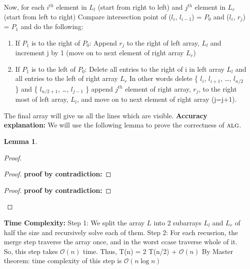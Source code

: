 \documentclass[11pt]{article}
\renewcommand{\O}{\mathcal{O}}
\newcommand{\alg}{\textsc{alg}}
\newtheorem{lemma}[theorem]{Lemma}
\begin{document}
Now, for each $i^{th}$ element in $L_l$ (start from right to left) and $j^{th}$ element in $L_r$ (start from left to right) \newline
Compare intersection point of ($l_i$, $l_{i-1}$) = $P_0$ and  ($l_i$, $r_j$) = $P_1$ and do the following: \newline
\begin{enumerate}
\item If $P_1$ is to the right of $P_0$: \newline
Append $r_j$ to the right of left array, $L_l$ and increment j by 1 (move on to next element of right array $L_r$) \newline
\item If $P_1$ is to the left of $P_0$: \newline
Delete all entries to the right of i in left array $L_l$ and all entries to the left of right array $L_r$ \newline
In other words delete \{ $l_i$, $l_{i+1}$, \dots , $l_{n/2}$ \} and \{ $l_{n/2+1}$, \dots, $l_{j-1}$ \} \newline
append $j^{th}$ element of right array, $r_j$, to the right most of left array, $L_l$, and move on to next
element of right array (j=j+1). \newline
\end{enumerate}
The final array will give us all the lines which are visible.   \newline
{\bf Accuracy explanation:}\newline
We will use the following lemma to prove the correctness of $\alg$.

\begin{lemma}\label{visible-lines-lemma}
\end{lemma}

\begin{proof}

\begin{proof}
{\bf proof by contradiction:} 
\end{proof}
\begin{proof}
{\bf proof by contradiction:} 
\end{proof}
\end{proof}

{\bf Time Complexity:}\newline
Step 1: We split the array $L$ into 2 subarrays $L_l$ and $L_r$ of half the size and recursively solve each of them. \newline
Step 2: For each recusrion, the merge step traverse the array once, and in the worst ccase traverse whole of it. \newline
So, this step takes $\O(n)$ time. \newline
Thus, T(n) = 2 T(n/2) + $\O(n)$ \newline
By Master theorem: time complexity of this step is $\O(n\log n)$ \newline
\end{document}
